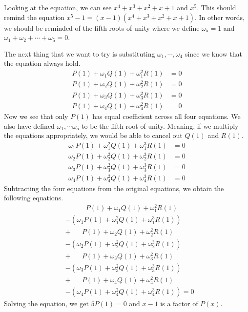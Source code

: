 \documentclass[../../../main.tex]{subfiles}
\begin{document}
\begin{solution}
Looking at the equation, we can see $x^4 + x^3 + x^2 + x + 1$ and
$x^5$. This should remind the equation $x^5 - 1 = (x - 1)
(x^4 + x^3 + x^2 + x + 1)$. In other words, we should be reminded of
the fifth roots of unity where we define $\omega_5 = 1$ and
$\omega_1 + \omega_2 + \cdots + \omega_5 = 0$.

The next thing that we want to try is substituting $\omega_1, \cdots,
\omega_4$ since we know that the equation always hold.
\begin{align*}
    P(1) + \omega_1 Q(1) + \omega_1^2 R(1) &= 0 \\
    P(1) + \omega_2 Q(1) + \omega_2^2 R(1) &= 0 \\
    P(1) + \omega_3 Q(1) + \omega_3^2 R(1) &= 0 \\
    P(1) + \omega_4 Q(1) + \omega_4^2 R(1) &= 0
\end{align*}
Now we see that only $P(1)$ has equal coefficient across all four
equations. We also have defined $\omega_1, \cdots \omega_5$ to be
the fifth root of unity. Meaning, if we multiply the equations
appropriately, we would be able to cancel out $Q(1)$ and $R(1)$.
\begin{align*}
    \omega_1 P(1) + \omega_1^2 Q(1) + \omega_1^3 R(1) &= 0 \\
    \omega_2 P(1) + \omega_2^2 Q(1) + \omega_2^3 R(1) &= 0 \\
    \omega_3 P(1) + \omega_3^2 Q(1) + \omega_3^3 R(1) &= 0 \\
    \omega_4 P(1) + \omega_4^2 Q(1) + \omega_4^3 R(1) &= 0
\end{align*}
Subtracting the four equations from the original equations,
we obtain the following equations.
\begin{align*}
    &\qquad\quad P(1) + \omega_1 Q(1) + \omega_1^2 R(1) \\
    &-\left(
        \omega_1 P(1) + \omega_1^2 Q(1) + \omega_1^3 R(1)
    \right) \\
    &+ \quad\ \ \ P(1) + \omega_2 Q(1) + \omega_2^2 R(1) \\
    &-\left(
        \omega_2 P(1) + \omega_2^2 Q(1) + \omega_2^3 R(1)
    \right) \\
    &+ \quad\ \ \ P(1) + \omega_3 Q(1) + \omega_3^2 R(1) \\
    &-\left(
        \omega_3 P(1) + \omega_3^2 Q(1) + \omega_3^3 R(1)
    \right) \\
    &+ \quad\ \ \ P(1) + \omega_4 Q(1) + \omega_4^2 R(1) \\
    &-\left(
        \omega_4 P(1) + \omega_4^2 Q(1) + \omega_4^3 R(1)
    \right) = 0
\end{align*}
Solving the equation, we get $5 P(1) = 0$ and $x - 1$ is a factor
of $P(x)$.
\end{solution}
\end{document}
